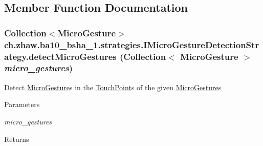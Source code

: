 \subsection{Member Function Documentation}
\hypertarget{interfacech_1_1zhaw_1_1ba10__bsha__1_1_1strategies_1_1IMicroGestureDetectionStrategy_a8593331fb67e5d4dc890d3db9f2d1b58}{
\subsubsection[{detectMicroGestures}]{\setlength{\rightskip}{0pt plus 5cm}Collection$<${\bf MicroGesture}$>$ ch.zhaw.ba10\_\-bsha\_\-1.strategies.IMicroGestureDetectionStrategy.detectMicroGestures (Collection$<$ {\bf MicroGesture} $>$ {\em micro\_\-gestures})}}
\label{interfacech_1_1zhaw_1_1ba10__bsha__1_1_1strategies_1_1IMicroGestureDetectionStrategy_a8593331fb67e5d4dc890d3db9f2d1b58}
Detect \hyperlink{}{MicroGesture}s in the \hyperlink{classch_1_1zhaw_1_1ba10__bsha__1_1_1TouchPoint}{TouchPoint}s of the given \hyperlink{}{MicroGesture}s


\begin{DoxyParams}{Parameters}
\item[{\em micro\_\-gestures}]\end{DoxyParams}
\begin{DoxyReturn}{Returns}

\end{DoxyReturn}


